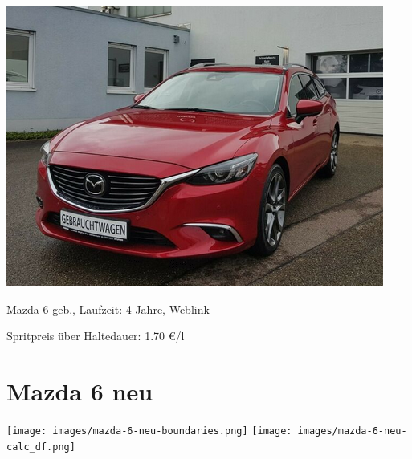\documentclass[landscape, DIV=99, 14pt]{scrartcl}
\begin{document}
\pagebreak
\null
\vspace{2cm}
\begin{center}
\includegraphics[width=0.9\columnwidth]{cars/mazda-6-alt.png}

Mazda 6 geb., Laufzeit: 4 Jahre, \href{https://suchen.mobile.de/fahrzeuge/details.html?action=parkItem&id=332186075}{Weblink}

Spritpreis \"uber Haltedauer: 1.70 \euro{}/l

\end{center}

\pagebreak


\twocolumn

\section*{Mazda 6 neu}
\begin{center}
\texttt{[image: images/mazda-6-neu-boundaries.png]}
\null
\vspace{0.5cm}
\texttt{[image: images/mazda-6-neu-calc\_df.png]}
\end{center}
\end{document}
